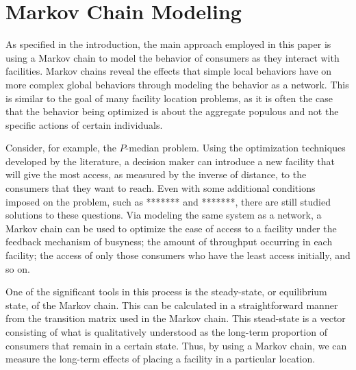 \documentclass[twoside,twocolumn]{article}
\begin{document}





\section{Markov Chain Modeling}

As specified in the introduction, the main approach employed in this paper is using a Markov chain to model the behavior of consumers as they interact with facilities.
Markov chains reveal the effects that simple local behaviors have on more complex global behaviors through modeling the behavior as a network.
This is similar to the goal of many facility location problems, as it is often the case that the behavior being optimized is about the aggregate populous and not the specific actions of certain individuals.

Consider, for example, the $P$-median problem. 
Using the optimization techniques developed by the literature, a decision maker can introduce a new facility that will give the most access, as measured by the inverse of distance, to the consumers that they want to reach. %
Even with some additional conditions imposed on the problem, such as ******* and *******, there are still studied solutions to these questions.%
Via modeling the same system as a network, a Markov chain can be used to optimize the ease of access to a facility under the feedback mechanism of busyness; the amount of throughput occurring in each facility; the access of only those consumers who have the least access initially, and so on.

One of the significant tools in this process is the steady-state, or equilibrium state, of the Markov chain.
This can be calculated in a straightforward manner from the transition matrix used in the Markov chain.
This stead-state is a vector consisting of what is qualitatively understood as the long-term proportion of consumers that remain in a certain state. %
Thus, by using a Markov chain, we can measure the long-term effects of placing a facility in a particular location.
\end{document}
